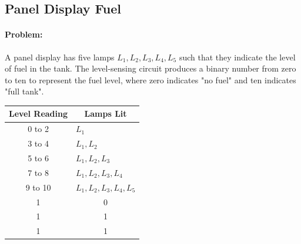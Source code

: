 \documentclass[12pt, a4paper]{report}
\begin{document}
\subsection{Panel Display Fuel}
\paragraph*{Problem: } A panel display has five lamps $L_1, L_2, L_3, L_4, L_5$ such that they indicate the level of fuel in the tank. The level-sensing circuit produces a binary number from zero to ten to represent the fuel level, where zero indicates "no fuel" and ten indicates "full tank".
\begin{center}
	\begin{tabular}{|c|l|}
		\hline
		Level Reading & \multicolumn{1}{c|}{Lamps Lit} \\ \hline
		0 to 2        & $L_1$                          \\ \hline
		3 to 4        & $L_1, L_2$                     \\ \hline
		5 to 6        & $L_1, L_2, L_3$                \\ \hline
		7  to 8       & $L_1, L_2, L_3, L_4$           \\ \hline
		9 to 10       & $L_1, L_2, L_3, L_4, L_5$      \\ \hline
		1             & \multicolumn{1}{c|}{0}         \\ \hline
		1             & \multicolumn{1}{c|}{1}         \\ \hline
		1             & \multicolumn{1}{c|}{1}         \\ \hline
	\end{tabular}
\end{center}
\end{document}
